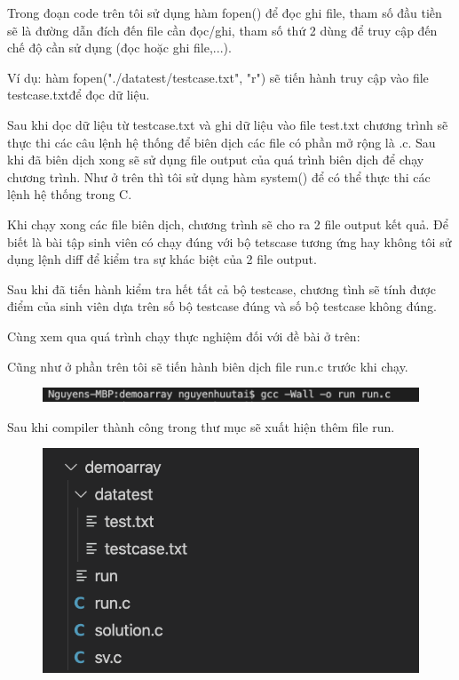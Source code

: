 \documentclass[12pt,a4paper]{article}
\begin{document}
Trong đoạn code trên tôi sử dụng hàm fopen() để đọc ghi file, tham số đầu tiền sẽ là đường dẫn đích đến file cần đọc/ghi, tham số thứ 2 dùng để truy cập đến chế độ cần sử dụng (đọc hoặc ghi file,...).

Ví dụ: hàm fopen("./datatest/testcase.txt", "r") sẽ tiến hành truy cập vào file testcase.txtđể đọc dữ liệu.

Sau khi dọc dữ liệu từ testcase.txt và ghi dữ liệu vào file test.txt chương trình sẽ thực thi các câu lệnh hệ thống để biên dịch các file có phần mở rộng là .c. Sau khi đã biên dịch xong sẽ sử dụng file output của quá trình biên dịch để chạy chương trình. Như ở trên thì tôi sử dụng hàm system() để có thể thực thi các lệnh hệ thống trong C.

Khi chạy xong các file biên dịch, chương trình sẽ cho ra 2 file output kết quả. Để biết là bài tập sinh viên có chạy đúng với bộ tetscase tương ứng hay không tôi sử dụng lệnh diff để kiểm tra sự khác biệt của 2 file output.

Sau khi đã tiến hành kiểm tra hết tất cả bộ testcase, chương tình sẽ tính được điểm của sinh viên dựa trên số bộ testcase đúng và số bộ testcase không đúng.

Cùng xem qua quá trình chạy thực nghiệm đối với đề bài ở trên:

Cũng như ở phần trên tôi sẽ tiến hành biên dịch file run.c trước khi chạy.

\begin{figure}[ht]
\begin{center}
\includegraphics[scale=.3]{hinhanh/compilerdemoarray.png}
\end{center}
\end{figure}

Sau khi compiler thành công trong thư mục sẽ xuất hiện thêm file run.

\begin{figure}[ht]
\begin{center}
\includegraphics[scale=.3]{hinhanh/cautrucarraysaucompiler.png}
\end{center}
\end{figure}
\end{document}
